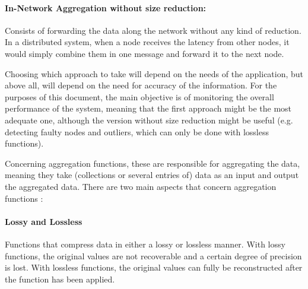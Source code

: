 \paragraph{In-Network Aggregation without size reduction:} Consists of forwarding the data along the network without any kind of reduction. In a distributed system, when a node receives the latency from other nodes, it would simply combine them in one message and forward it to the next node.
\par Choosing which approach to take will depend on the needs of the application, but above all, will depend on the need for accuracy of the information. For the purposes of this document, the main objective is of monitoring the overall performance of the system, meaning that the first approach might be the most adequate one, although the version without size reduction might be useful (e.g. detecting faulty nodes and outliers, which can only be done with lossless functions).
\par Concerning aggregation functions, these are responsible for aggregating the data, meaning they take (collections or several entries of) data as an input and output the aggregated data. There are two main aspects that concern aggregation functions \cite{Fasolo2007}:
\paragraph{Lossy and Lossless} Functions that compress data in either a lossy or lossless manner. With lossy functions, the original values are not recoverable and a certain degree of precision is lost. With lossless functions, the original values can fully be reconstructed after the function has been applied. %

